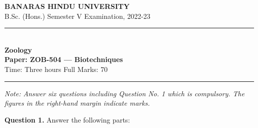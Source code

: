 \documentclass[11pt,a4paper]{article}
\begin{document}
\begin{center}
  {\large\bfseries BANARAS HINDU UNIVERSITY}\\[2pt]
  {\normalsize B.Sc. (Hons.) Semester V Examination, 2022-23}\\[6pt]
  \rule{0.8\linewidth}{0.5pt}\\[6pt]
  {\large\bfseries Zoology}\\[4pt]
  {\large\bfseries Paper: ZOB-504 --- Biotechniques}\\[4pt]
  {\normalsize Time: Three hours \hfill Full Marks: 70}
\end{center}

\rule{\linewidth}{0.4pt}

\smallskip



\noindent   \textit{Note: Answer six questions including Question No. 1 which is compulsory. The figures in the right-hand margin indicate marks.}

\bigskip




\noindent   \textbf{Question 1.} Answer the following parts:
\end{document}
